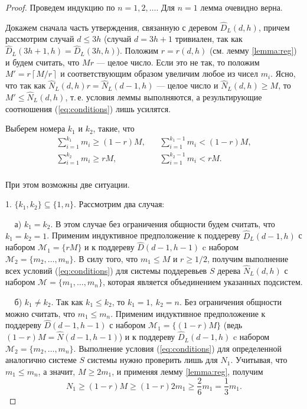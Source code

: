 \documentclass[12pt, a4paper]{article}
\theoremstyle{plain}
\theoremstyle{definition}
\theoremstyle{definition}
\newcommand{\Sum}{\displaystyle\sum\limits}
\newcommand{\ceil}[1]{\left\lceil{#1}\right\rceil}
\renewcommand{\le}{\leqslant}
\renewcommand{\ge}{\geqslant}
\renewcommand{\hat}{\widehat}
\newcommand{\N}{\hat{N}}
\begin{document}
\begin{proof}
Проведем индукцию по $n=1,2,\dots$.
Для $n=1$ лемма очевидно верна.

Докажем сначала часть утверждения, связанную с деревом $\hat{D}_L(d,h)$, причем рассмотрим случай $d \le 3h$ (случай $d = 3h+1$ тривиален, так как $\hat{D}_L(3h+1,h) = \hat{D}_L(3h,h)$). Положим $r = r(d,h)$ (см. лемму \ref{lemma:reg}) и будем считать, что $ M r$ --- целое число.
Если это не так, то положим $M' = r\ceil{M/r}$ и соответствующим 
образом увеличим любое из чисел $m_i$.
Ясно, что так как $\N_L(d,h) r = \N_L(d-1,h)$ --- целое число и $\N_L(d,h) \ge M$, то 
$M' \le \N_L(d,h)$, т.\,е. условия леммы выполняются, а  результирующие соотношения (\ref{eq:conditions}) 
лишь усилятся.

Выберем номера $k_1$ и $k_2$, такие, что 
\begin{equation*}
\begin{split}
	\Sum_{i=1}^{k_1}m_i \ge (1- r)  M,& ~~~~ \Sum_{i=1}^{k_1-1} m_i < (1-r)  M,\\	
	\Sum_{i=1}^{k_2}m_i \ge r M,& ~~~~ \Sum_{i=1}^{k_2-1} m_i < r M.\\
\end{split}
\end{equation*}

При этом возможны две ситуации.

1. $\{k_1,k_2\} \subseteq \{1,n\}$. Рассмотрим два случая:

$\mspace{20mu}$а) $k_1 = k_2$. В этом случае без ограничения общности будем
 считать, что $k_1 = k_2 = 1$. Применим индуктивное предположение к поддереву $\hat{D}_L(d-1,h)$ с набором
$\mathcal{M}_1 = \{rM\}$ и к поддереву
$\hat{D}(d-1,h-1)$ c набором $\mathcal{M}_2 = \{m_2, \dots,m_n\}$. В силу того, что $m_1 \le M$ и $r \ge 1/2$,
получим выполнение всех условий (\ref{eq:conditions}) 
для системы поддеревьев $S$ дерева $\hat{N}_L(d,h)$ с набором
$\mathcal{M} = \{m_1, \dots, m_n\}$, которая является 
объединением указанных подсистем.

$\mspace{20mu}$б) $k_1 \neq k_2$. Так как $k_1 \le k_2$, то $k_1 = 1,~k_2 = n$. Без ограничения общности можно 
считать, что $m_1 \le m_n$.
Применим индуктивное предположение к поддереву $\hat{D}(d-1,h-1)$ с набором
$\mathcal{M}_1 = \{(1-r) M\}$ (ведь $(1-r)M = \hat{N}(d-1,h-1)$) и к поддереву
$\hat{D}_L(d-1,h)$ c набором $\mathcal{M}_2 = \{m_2, \dots,m_n\}$. Выполнение условия (\ref{eq:conditions}) 
для определенной аналогично системе $S$ системы нужно проверить лишь для $N_1$. Учитывая, что $m_1 \le m_n$, а значит,  $M \ge 2m_1$, и применяя лемму \ref{lemma:reg}, получим
\[
N_1 \ge (1-r)  M \ge (1-r)2m_1 \ge \frac{2}{6} m_1 = \frac{1}{3}m_1.
\]



\end{proof}
\end{document}
